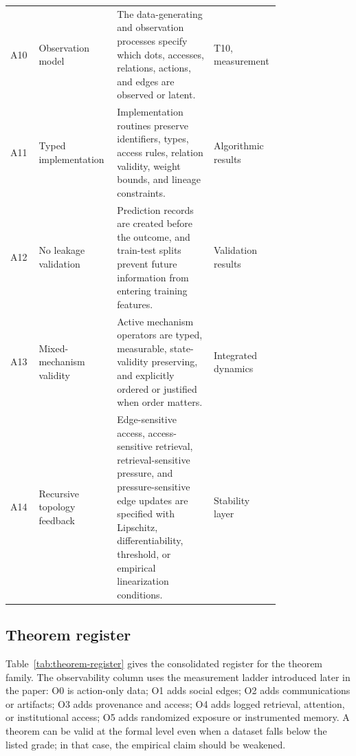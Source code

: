 \documentclass[11pt]{article}
\theoremstyle{remark}
\begin{document}
{\begin{longtable}{L{0.10\linewidth}L{0.22\linewidth}L{0.34\linewidth}L{0.12\linewidth}}
A10 & Observation model & The data-generating and observation processes specify which dots, accesses, relations, actions, and edges are observed or latent. & T10, measurement\\
A11 & Typed implementation & Implementation routines preserve identifiers, types, access rules, relation validity, weight bounds, and lineage constraints. & Algorithmic results\\
A12 & No leakage validation & Prediction records are created before the outcome, and train-test splits prevent future information from entering training features. & Validation results\\
A13 & Mixed-mechanism validity & Active mechanism operators are typed, measurable, state-validity preserving, and explicitly ordered or justified when order matters. & Integrated dynamics\\
A14 & Recursive topology feedback & Edge-sensitive access, access-sensitive retrieval, retrieval-sensitive pressure, and pressure-sensitive edge updates are specified with Lipschitz, differentiability, threshold, or empirical linearization conditions. & Stability layer\\
\bottomrule
\end{longtable}
}

\subsection{Theorem register}\label{theorem-register}

Table~\ref{tab:theorem-register} gives the consolidated register for the theorem family. The observability column uses the measurement ladder introduced later in the paper: O0 is action-only data; O1 adds social edges; O2 adds communications or artifacts; O3 adds provenance and access; O4 adds logged retrieval, attention, or institutional access; O5 adds randomized exposure or instrumented memory. A theorem can be valid at the formal level even when a dataset falls below the listed grade; in that case, the empirical claim should be weakened.
\end{document}
